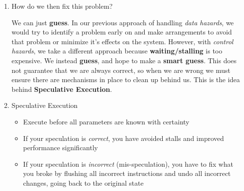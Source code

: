 \documentclass[12pt]{article}
\newenvironment{QandA}{\begin{enumerate}[label=\bfseries\alph*.]\bfseries}
                      {\end{enumerate}}
\newenvironment{answered}{\par\quad\normalfont}{}
\begin{document}
\begin{QandA}
\begin{answered}
\begin{itemize}
    \item Lastly, building upon the first challenge - when the processor is handling a Branch instruction, it is usually Fetched and then moves onto the \textit{Decode Stage}. But what should we be doing in the \textit{Fetch Stage} next? Logically, we will have to fetch the next instruction in the sequence. But if the previous instruction was indeed a \textbf{Branch} instruction, we should be going to the \textit{target} in the next cycle instead of the next sequential instruction. This is another fundamental problem in handling \textbf{Branch} instructions. \textit{We don't yet know what the right thing to do is, but we have to do something!}. We can \textit{not do anything} but that would then indicate a 3 cycle stall/gap, which isn't good for performance.
\end{itemize}
\end{answered}

\item How do we then fix this problem?
\begin{answered}
    We can just \textbf{guess}. In our previous approach of handling \textit{data hazards}, we would try to identify a problem early on and make arrangements to avoid that problem or minimize it's effects on the system. However, with \textit{control hazards}, we take a different approach because \textbf{waiting/stalling} is too expensive. We instead \textbf{guess}, and hope to make a \textbf{smart guess}. This does not guarantee that we are always correct, so when we are wrong we must ensure there are mechanisms in place to clean up behind us. This is the idea behind \textbf{Speculative Execution}.
\end{answered}

\item Speculative Execution
\vspace{-0.85cm}
\begin{answered}
\begin{itemize}
    \item Execute before all parameters are known with certainty
    \item If your speculation is \textit{correct}, you have avoided stalls and improved performance significantly
    \item If your speculation is \textit{incorrect} (mis-speculation), you have to fix what you broke by flushing all incorrect instructions and undo all incorrect changes, going back to the original state
\end{itemize}
\end{answered}


\end{QandA}
\end{document}
